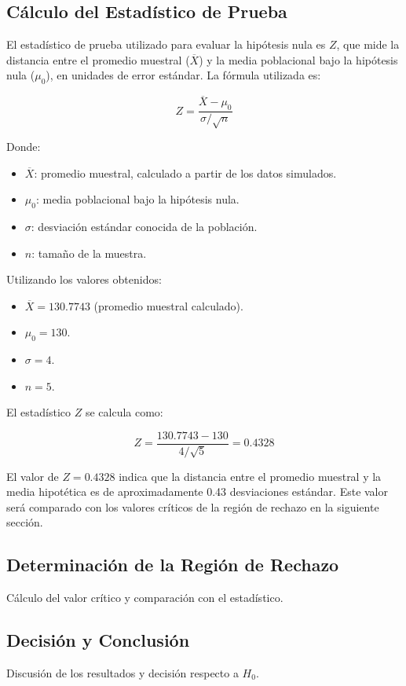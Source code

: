 \documentclass[a4paper,12pt]{article}
\begin{document}
\subsection{Cálculo del Estadístico de Prueba}

El estadístico de prueba utilizado para evaluar la hipótesis nula es \( Z \), que mide la distancia entre el promedio muestral (\( \overline{X} \)) y la media poblacional bajo la hipótesis nula (\( \mu_0 \)), en unidades de error estándar. La fórmula utilizada es:

\[
Z = \frac{\overline{X} - \mu_0}{\sigma / \sqrt{n}}
\]

Donde:
\begin{itemize}
    \item \( \overline{X} \): promedio muestral, calculado a partir de los datos simulados.
    \item \( \mu_0 \): media poblacional bajo la hipótesis nula.
    \item \( \sigma \): desviación estándar conocida de la población.
    \item \( n \): tamaño de la muestra.
\end{itemize}

Utilizando los valores obtenidos:
\begin{itemize}
    \item \( \overline{X} = 130.7743 \) (promedio muestral calculado).
    \item \( \mu_0 = 130 \).
    \item \( \sigma = 4 \).
    \item \( n = 5 \).
\end{itemize}

El estadístico \( Z \) se calcula como:

\[
Z = \frac{130.7743 - 130}{4 / \sqrt{5}} = 0.4328
\]

El valor de \( Z = 0.4328 \) indica que la distancia entre el promedio muestral y la media hipotética es de aproximadamente 0.43 desviaciones estándar. Este valor será comparado con los valores críticos de la región de rechazo en la siguiente sección.

\subsection{Determinación de la Región de Rechazo}
Cálculo del valor crítico y comparación con el estadístico.
\subsection{Decisión y Conclusión}
Discusión de los resultados y decisión respecto a \( H_0 \).
\end{document}
